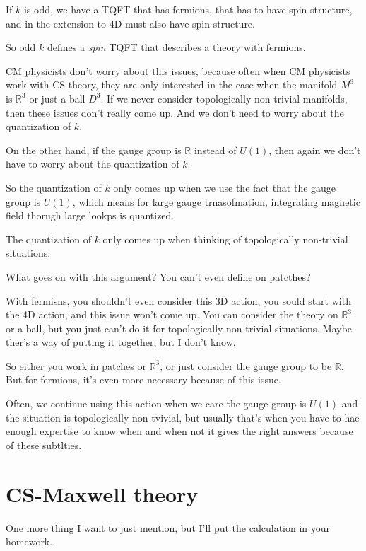 If $k$ is odd,
we have a TQFT that has fermions,
that has to have spin structure,
and in the extension to 4D must also have spin structure.

So odd $k$ defines a \emph{spin} TQFT that describes a theory with fermions.

CM physicists don't worry about this issues,
because often when CM physicists work with CS theory,
they are only interested in the case when the manifold $M^3$ is $\mathbb{R}^3$
or just a ball $D^3$.
If we never consider topologically non-trivial manifolds,
then these issues don't really come up.
And we don't need to worry about the quantization of $k$.

On the other hand,
if the gauge group is $\mathbb{R}$ instead of $U(1)$,
then again we don't have to worry about the quantization of $k$.

So the quantization of $k$ only comes up when we use the fact that the gauge
group is $U(1)$,
which means for large gauge trnasofmation,
integrating magnetic field thorugh large lookps is quantized.

The quantization of $k$ only comes up when thinking of topologically non-trivial
situations.

\begin{question}
    What goes on with this argument?
    You can't even define on patcthes?
\end{question}
With fermisns,
you shouldn't even consider this 3D action,
you sould start with the 4D action,
and this issue won't come up.
You can consider the theory on $\mathbb{R}^3$ or a ball,
but you just can't do it for topologically non-trivial situations.
Maybe ther's a way of putting it together,
but I don't know.

So either you work in patches or $\mathbb{R}^3$,
or just consider the gauge group to be $\mathbb{R}$.
But for fermions,
it's even more necessary because of this issue.

Often,
we continue using this action when we care the gauge group is $U(1)$ and the
situation is topologically non-tvivial,
but usually that's when you have to hae enough expertise to know when and when
not it gives the right answers because of these subtlties.

\section{CS-Maxwell theory}
One more thing I want to just mention,
but I'll put the calculation in your homework.

